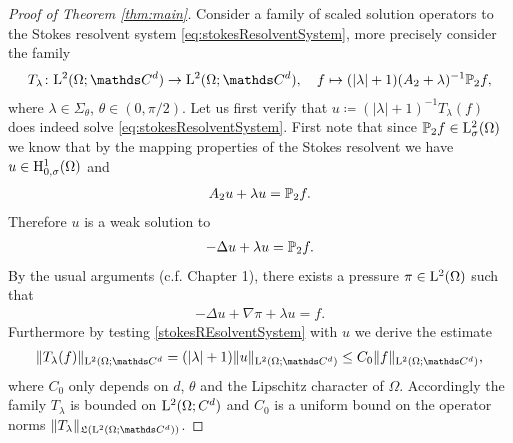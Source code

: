 \begin{proof}[Proof of Theorem \ref{thm:main}]
  Consider a family of scaled solution operators to the Stokes resolvent system \eqref{eq:stokesResolventSystem}, more precisely consider the family
  \begin{align*}
    T_\lambda \colon \Ell^2(\Omega; \C^d) \to \Ell^2(\Omega; \C^d), \quad f \mapsto (|\lambda| + 1) (A_2 + \lambda)^{-1} \PP_2 f,
  \end{align*}
  where $\lambda \in \Sigma_\theta$, $\theta \in (0, \pi/2)$.
  Let us first verify that $u \coloneqq (|\lambda| + 1)^{-1} T_\lambda(f)$ does indeed solve \eqref{eq:stokesResolventSystem}.
  First note that since $\mathbb{P}_2 f \in \mathrm{L}^2_\sigma(\Omega)$ we know that by the mapping properties of the Stokes resolvent we have $u \in \mathrm{H}^1_{0,\sigma}(\Omega)$ and
  \begin{align*}
    A_2 u + \lambda u = \mathbb{P}_2 f.
  \end{align*}
  Therefore $u$ is a weak solution to 
  \begin{align*}
    -\Delta u + \lambda u = \mathbb{P}_2 f.
  \end{align*}
  By the usual arguments (c.f. Chapter 1), there exists a pressure $\pi \in \mathrm{L}^2(\Omega)$ such that 
  \begin{align*}
    -\Delta u + \nabla \pi + \lambda u = f.
  \end{align*}
  Furthermore by testing \eqref{stokesREsolventSystem} with $u$ we derive the estimate
  \begin{align*}
    \| T_\lambda(f) \|_{\Ell^2(\Omega; \C^d} = (|\lambda| + 1) \|u\|_{\Ell^2(\Omega; \C^d)}
    \leq C_0 \|f\|_{\Ell^2(\Omega; \C^d)},
  \end{align*}
  where $C_0$ only depends on $d$, $\theta$ and the Lipschitz character of $\Omega$.
  Accordingly the family $T_\lambda$ is bounded on $\mathrm{L}^2(\Omega; C^d)$ and $C_0$ is a uniform bound on the operator norms $\|T_\lambda\|_{\Li(\Ell^2(\Omega; \C^d))}$.


\end{proof}
